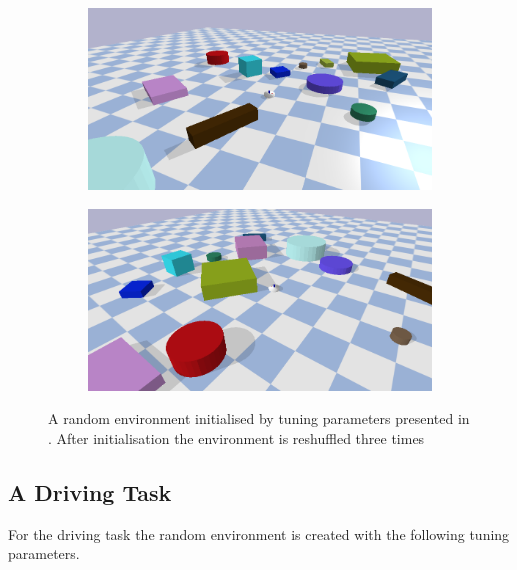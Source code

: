 \begin{figure}[H]
    \vspace{0.2cm}
    \begin{subfigure}{.49\textwidth}
    \includegraphics[width=\textwidth]{figures/results/random3}
    \end{subfigure}
    \hfill
    \begin{subfigure}{.49\textwidth}
    \centering
    \includegraphics[width=\textwidth]{figures/results/random4}
    \end{subfigure}
    \caption{A random environment initialised by tuning parameters presented in . After initialisation the environment is reshuffled three times}%
    \label{fig:random_environment_reshuffle}
\end{figure}

\subsection{A Driving Task}%
\label{subsec:rand_driving}
For the driving task the random environment is created with the following tuning parameters.\bs

